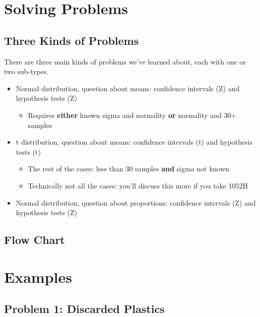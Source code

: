 \documentclass[]{article}
\providecommand{\tightlist}{%
  \setlength{\itemsep}{0pt}\setlength{\parskip}{0pt}}
\begin{document}
\hypertarget{solving-problems}{%
\section{Solving Problems}\label{solving-problems}}

\hypertarget{three-kinds-of-problems}{%
\subsection{Three Kinds of Problems}\label{three-kinds-of-problems}}

There are three main kinds of problems we've learned about, each with
one or two sub-types.

\begin{itemize}
\tightlist
\item
  Normal distribution, question about means: confidence intervals (Z)
  and hypothesis tests (Z)

  \begin{itemize}
  \tightlist
  \item
    Requires \textbf{either} known sigma and normality \textbf{or}
    normality and 30+ samples
  \end{itemize}
\item
  t distribution, question about means: confidence intervals (t) and
  hypothesis tests (t)

  \begin{itemize}
  \tightlist
  \item
    The rest of the cases: less than 30 samples \textbf{and} sigma not
    known
  \item
    Technically not all the cases: you'll discuss this more if you take
    1052H
  \end{itemize}
\item
  Normal distribution, question about proportions: confidence intervals
  (Z) and hypothesis tests (Z)
\end{itemize}

\hypertarget{flow-chart}{%
\subsection{Flow Chart}\label{flow-chart}}

\hypertarget{examples}{%
\section{Examples}\label{examples}}

\hypertarget{problem-1-discarded-plastics}{%
\subsection{Problem 1: Discarded
Plastics}\label{problem-1-discarded-plastics}}
\end{document}

